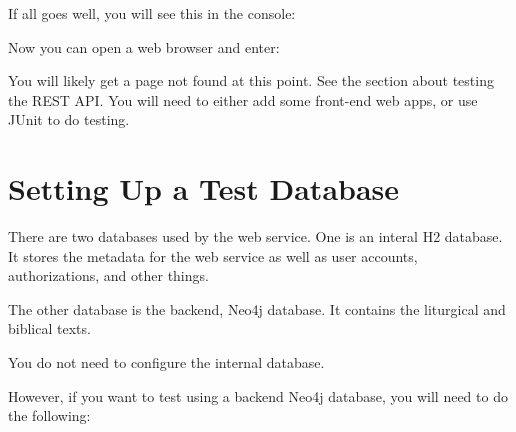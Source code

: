 \documentclass[]{memoir}
\begin{document}
If all goes well, you will see this in the console:






Now you can open a web browser and enter:


You will likely get a page not found at this point.  See the section about testing the REST API.  You will need to either add some front-end web apps, or use JUnit to do testing.

\chapter{Setting Up a Test Database}

There are two databases used by the web service.  One is an interal H2 database.  It stores the metadata for the web service as well as user accounts, authorizations, and other things. 

The other database is the backend, Neo4j database.  It contains the liturgical and biblical texts.

You do not need to configure the internal database.

However, if you want to test using a backend Neo4j database, you will need to do the following:
\end{document}
